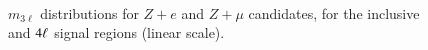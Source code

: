 \begin{appendices}
\begin{figure}[h]
{  }
   \\
  \caption{$m_{3\ell}$ distributions for $Z+e$ and $Z+\mu$ candidates, for the inclusive and $4\ell$ signal regions (linear scale).}
  \label{fig:SR-m3l-1-linear}
\end{figure}


\end{appendices}
